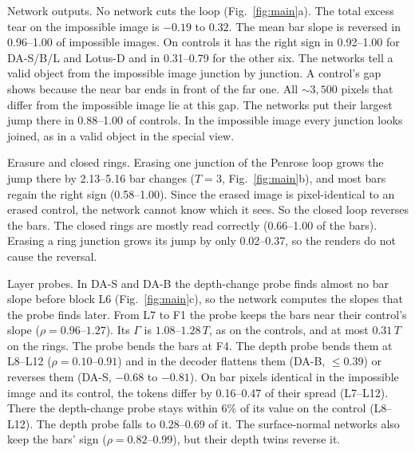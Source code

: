 \documentclass[10pt,twocolumn,letterpaper]{article}
\makeatletter
\renewcommand\paragraph{\@startsection{paragraph}{4}{\z@}{1.1ex \@plus.4ex \@minus.2ex}{-1em}%
  {\normalfont\normalsize\bfseries}}
\makeatother
\begin{document}
\paragraph{Network outputs.}
No network cuts the loop (Fig.~\ref{fig:main}a). The total excess tear on the impossible image is $-0.19$ to $0.32$.
The mean bar slope is reversed in 0.96--1.00 of impossible images. On
controls it has the right sign in 0.92--1.00 for DA-S/B/L and Lotus-D and in 0.31--0.79 for the other six. The
networks tell a valid object from the impossible image junction by junction. A control's gap shows because the
near bar ends in front of the far one. All ${\sim}3{,}500$ pixels that differ from the impossible image lie at this
gap. The networks put their largest jump there in 0.88--1.00 of controls. In the impossible image every junction looks
joined, as in a valid object in the special view.

\paragraph{Erasure and closed rings.}
Erasing one junction of the Penrose loop grows the jump there by 2.13--5.16 bar changes ($T=3$, Fig.~\ref{fig:main}b),
and most bars regain the right sign \mbox{(0.58--1.00)}. Since the erased image is pixel-identical to an erased control, the
network cannot know which it sees. So the closed loop reverses the bars. The closed rings
are mostly read correctly (0.66--1.00 of the bars). Erasing a ring junction grows its jump by only 0.02--0.37, so the renders do not cause the reversal.

\paragraph{Layer probes.}
In DA-S and DA-B the depth-change probe finds almost no bar slope before block L6 (Fig.~\ref{fig:main}c), so the network computes the slopes that the probe finds later. From L7 to F1 the probe keeps the bars near their control's slope
($\rho=0.96$--$1.27$). Its $\Gamma$ is $1.08$--$1.28\,T$, as on the controls, and at most $0.31\,T$ on the rings. The
probe bends the bars at F4. The depth probe bends them at \mbox{L8--L12} ($\rho=0.10$--$0.91$) and in the decoder flattens
them (DA-B, ${\le}0.39$) or reverses them (DA-S, $-0.68$ to $-0.81$). On bar pixels identical in the impossible image
and its control, the tokens differ by 0.16--0.47 of their spread (L7--L12). There the depth-change
probe stays within 6\% of its value on the control (L8--L12). The depth probe falls to 0.28--0.69 of it.
The surface-normal networks also keep the bars' sign ($\rho=0.82$--$0.99$), but their depth twins reverse it.
\end{document}
